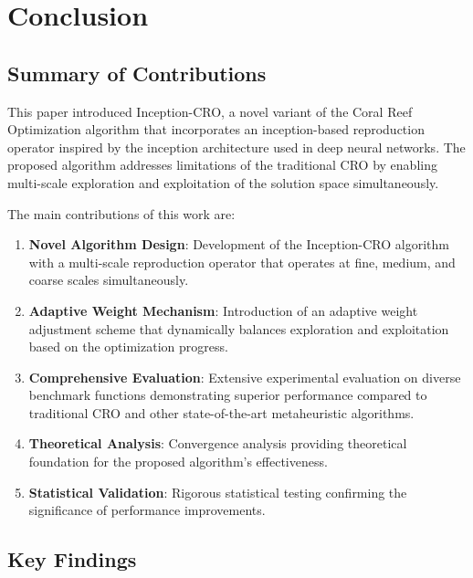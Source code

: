 \section{Conclusion}
\label{sec:conclusion}

\subsection{Summary of Contributions}

This paper introduced Inception-CRO, a novel variant of the Coral Reef Optimization algorithm that incorporates an inception-based reproduction operator inspired by the inception architecture used in deep neural networks. The proposed algorithm addresses limitations of the traditional CRO by enabling multi-scale exploration and exploitation of the solution space simultaneously.

The main contributions of this work are:

\begin{enumerate}
    \item \textbf{Novel Algorithm Design}: Development of the Inception-CRO algorithm with a multi-scale reproduction operator that operates at fine, medium, and coarse scales simultaneously.
    
    \item \textbf{Adaptive Weight Mechanism}: Introduction of an adaptive weight adjustment scheme that dynamically balances exploration and exploitation based on the optimization progress.
    
    \item \textbf{Comprehensive Evaluation}: Extensive experimental evaluation on diverse benchmark functions demonstrating superior performance compared to traditional CRO and other state-of-the-art metaheuristic algorithms.
    
    \item \textbf{Theoretical Analysis}: Convergence analysis providing theoretical foundation for the proposed algorithm's effectiveness.
    
    \item \textbf{Statistical Validation}: Rigorous statistical testing confirming the significance of performance improvements.
\end{enumerate}

\subsection{Key Findings}

